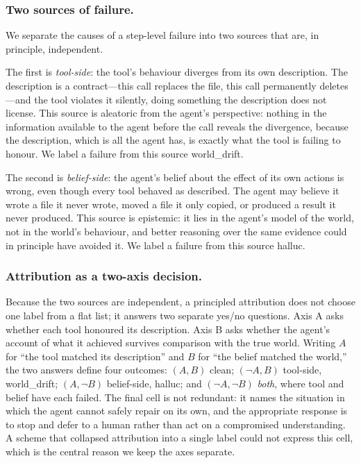 \documentclass[runningheads]{llncs}
\begin{document}
\subsubsection{Two sources of failure.}
We separate the causes of a step-level failure into two sources that are, in principle, independent.

The first is \emph{tool-side}: the tool's behaviour diverges from its own description. The description is a contract---this call replaces the file, this call permanently deletes---and the tool violates it silently, doing something the description does not license. This source is aleatoric from the agent's perspective: nothing in the information available to the agent before the call reveals the divergence, because the description, which is all the agent has, is exactly what the tool is failing to honour. We label a failure from this source \textsf{world\_drift}.

The second is \emph{belief-side}: the agent's belief about the effect of its own actions is wrong, even though every tool behaved as described. The agent may believe it wrote a file it never wrote, moved a file it only copied, or produced a result it never produced. This source is epistemic: it lies in the agent's model of the world, not in the world's behaviour, and better reasoning over the same evidence could in principle have avoided it. We label a failure from this source \textsf{halluc}.

\subsubsection{Attribution as a two-axis decision.}
Because the two sources are independent, a principled attribution does not choose one label from a flat list; it answers two separate yes/no questions. Axis A asks whether each tool honoured its description. Axis B asks whether the agent's account of what it achieved survives comparison with the true world. Writing $A$ for ``the tool matched its description'' and $B$ for ``the belief matched the world,'' the two answers define four outcomes: $(A,B)$ \textsf{clean}; $(\neg A, B)$ tool-side, \textsf{world\_drift}; $(A, \neg B)$ belief-side, \textsf{halluc}; and $(\neg A, \neg B)$ \emph{both}, where tool and belief have each failed. The final cell is not redundant: it names the situation in which the agent cannot safely repair on its own, and the appropriate response is to stop and defer to a human rather than act on a compromised understanding. A scheme that collapsed attribution into a single label could not express this cell, which is the central reason we keep the axes separate.
\end{document}
